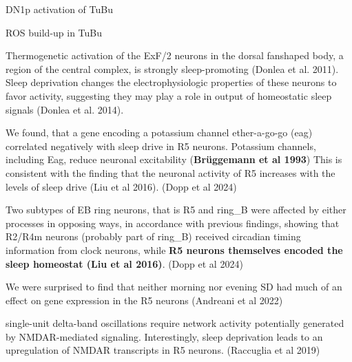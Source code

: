     DN1p activation of TuBu

    ROS build-up in TuBu


    Thermogenetic activation of the ExF/2 neurons in the dorsal fanshaped body, a 
region of the central complex, is strongly sleep-promoting (Donlea et al. 2011). Sleep 
deprivation changes the electrophysiologic properties of these neurons to favor activity,
suggesting they may play a role in output of homeostatic sleep signals (Donlea et al. 2014).

We found, that a gene encoding a potassium channel ether-a-go-go (eag) correlated negatively with sleep drive in R5 neurons.
    Potassium channels, including Eag, reduce neuronal excitability (\textbf{Brüggemann et al 1993})
    This is consistent with the finding that the neuronal activity of R5 increases with the levels of sleep drive
    (Liu et al 2016).
    (Dopp et al 2024)

    Two subtypes of EB ring neurons, that is R5 and ring\_B were affected by either processes in opposing ways, in
    accordance with previous findings, showing that R2/R4m neurons (probably part of ring\_B) received circadian timing
    information from clock neurons, while \textbf{R5 neurons themselves encoded the sleep homeostat (Liu et al 2016)}.
    (Dopp et al 2024)


    We were surprised to find that neither morning nor evening SD had much of an effect on gene expression in the R5 neurons
    \cite{andreaniCircadianProgrammingEllipsoid2022} (Andreani et al 2022)

    single-unit delta-band oscillations require network activity potentially generated by NMDAR-mediated signaling. Interestingly, sleep deprivation leads to an upregulation of NMDAR transcripts in R5 neurons.
    \cite{raccugliaNetworkSpecificSynchronizationElectrical2019} (Raccuglia et al 2019)


